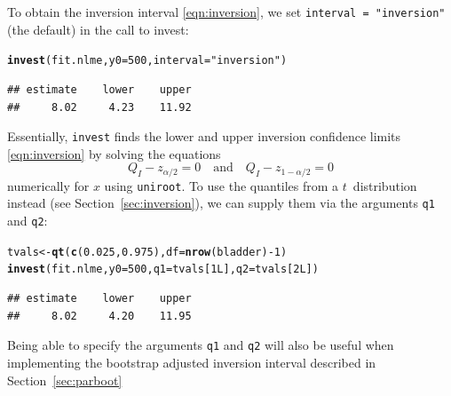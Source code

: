\documentclass{article}\usepackage[]{graphicx}\usepackage[]{color}
\makeatletter
\newcommand{\hlnum}[1]{\textcolor[rgb]{0.686,0.059,0.569}{#1}}%
\newcommand{\hlstr}[1]{\textcolor[rgb]{0.192,0.494,0.8}{#1}}%
\newcommand{\hlopt}[1]{\textcolor[rgb]{0,0,0}{#1}}%
\newcommand{\hlstd}[1]{\textcolor[rgb]{0.345,0.345,0.345}{#1}}%
\newcommand{\hlkwb}[1]{\textcolor[rgb]{0.69,0.353,0.396}{#1}}%
\newcommand{\hlkwc}[1]{\textcolor[rgb]{0.333,0.667,0.333}{#1}}%
\newcommand{\hlkwd}[1]{\textcolor[rgb]{0.737,0.353,0.396}{\textbf{#1}}}%
\newenvironment{kframe}{%
 \def\at@end@of@kframe{}%
 \ifinner\ifhmode%
  \def\at@end@of@kframe{\end{minipage}}%
  \begin{minipage}{\columnwidth}%
 \fi\fi%
 \def\FrameCommand##1{\hskip\@totalleftmargin \hskip-\fboxsep
 \colorbox{shadecolor}{##1}\hskip-\fboxsep
     \hskip-\linewidth \hskip-\@totalleftmargin \hskip\columnwidth}%
 \MakeFramed {\advance\hsize-\width
   \@totalleftmargin\z@ \linewidth\hsize
   \@setminipage}}%
 {\par\unskip\endMakeFramed%
 \at@end@of@kframe}
\newenvironment{knitrout}{}{} %
\makeatother
\begin{document}
To obtain the inversion interval \eqref{eqn:inversion}, we set \texttt{interval = "inversion"} (the default) in the call to invest:
\begin{knitrout}
\color{fgcolor}\begin{kframe}
\begin{alltt}
\hlkwd{invest}\hlstd{(fit.nlme,} \hlkwc{y0} \hlstd{=} \hlnum{500}\hlstd{,} \hlkwc{interval} \hlstd{=} \hlstr{"inversion"}\hlstd{)}
\end{alltt}
\begin{verbatim}
## estimate    lower    upper 
##     8.02     4.23    11.92
\end{verbatim}
\end{kframe}
\end{knitrout}
Essentially, \texttt{invest} finds the lower and upper inversion confidence limits \eqref{eqn:inversion} by solving the equations
\begin{equation*}
  Q_I - z_{\alpha/2} = 0 \quad \text{and} \quad Q_I - z_{1-\alpha/2} = 0
\end{equation*}
numerically for $x$ using \texttt{uniroot}. To use the quantiles from a $t$~distribution instead (see Section~\ref{sec:inversion}), we can supply them via the arguments \texttt{q1} and \texttt{q2}:
\begin{knitrout}
\color{fgcolor}\begin{kframe}
\begin{alltt}
\hlstd{tvals} \hlkwb{<-} \hlkwd{qt}\hlstd{(}\hlkwd{c}\hlstd{(}\hlnum{0.025}\hlstd{,} \hlnum{0.975}\hlstd{),} \hlkwc{df} \hlstd{=} \hlkwd{nrow}\hlstd{(bladder)} \hlopt{-} \hlnum{1}\hlstd{)}
\hlkwd{invest}\hlstd{(fit.nlme,} \hlkwc{y0} \hlstd{=} \hlnum{500}\hlstd{,} \hlkwc{q1} \hlstd{= tvals[}\hlnum{1L}\hlstd{],} \hlkwc{q2} \hlstd{= tvals[}\hlnum{2L}\hlstd{])}
\end{alltt}
\begin{verbatim}
## estimate    lower    upper 
##     8.02     4.20    11.95
\end{verbatim}
\end{kframe}
\end{knitrout}
Being able to specify the arguments \texttt{q1} and \texttt{q2} will also be useful when implementing the bootstrap adjusted inversion interval described in Section~\ref{sec:parboot}

\end{document}

